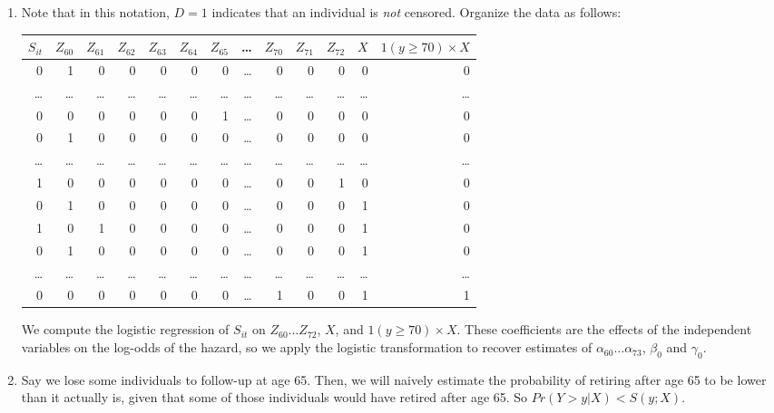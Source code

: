 \documentclass{article}
\begin{document}
\begin{enumerate}
\begin{enumerate}
		\item

		Note that in this notation, $D = 1$ indicates that an individual is \textit{not} censored. Organize the data as follows:

		\begin{tabular}{ r r r r r r r r r r r r r} 
		  $S_{it}$ & $Z_{60}$ & $Z_{61}$ & $Z_{62}$ & $Z_{63}$ & $Z_{64}$ & $Z_{65}$ &\ldots & $Z_{70}$ & $Z_{71}$ & $Z_{72}$ & $X$ & $1(y\geq 70) \times X$ \\ \hline
		  0 & 1 & 0 & 0 & 0 & 0 & 0 & \ldots & 0 & 0 & 0 & 0 & 0 \\
		  \ldots & \ldots & \ldots & \ldots & \ldots & \ldots & \ldots & \ldots & \ldots & \ldots & \ldots & \ldots & \ldots \\
		  0 & 0 & 0 & 0 & 0 & 0 & 1 & \ldots & 0 & 0 & 0 & 0 & 0 \\ \hline
		  0 & 1 & 0 & 0 & 0 & 0 & 0 & \ldots & 0 & 0 & 0 & 0 & 0 \\
		  \ldots & \ldots & \ldots & \ldots & \ldots & \ldots & \ldots & \ldots & \ldots & \ldots & \ldots & \ldots & \ldots \\
		  1 & 0 & 0 & 0 & 0 & 0 & 0 & \ldots & 0 & 0 & 1 & 0 & 0 \\ \hline
		  0 & 1 & 0 & 0 & 0 & 0 & 0 & \ldots & 0 & 0 & 0 & 1 & 0 \\
		  1 & 0 & 1 & 0 & 0 & 0 & 0 & \ldots & 0 & 0 & 0 & 1 & 0 \\ \hline
		  0 & 1 & 0 & 0 & 0 & 0 & 0 & \ldots & 0 & 0 & 0 & 1 & 0 \\
		  \ldots & \ldots & \ldots & \ldots & \ldots & \ldots & \ldots & \ldots & \ldots & \ldots & \ldots & \ldots & \ldots \\
		  0 & 0 & 0 & 0 & 0 & 0 & 0 & \ldots & 1 & 0 & 0 & 1 & 1 \\

		\end{tabular}

		We compute the logistic regression of $S_{it}$ on $Z_{60}\ldots Z_{72}$, $X$, and $1(y\geq 70) \times X$. These coefficients are the effects of the independent variables on the log-odds of the hazard, so we apply the logistic transformation to recover estimates of $\alpha_{60} \ldots \alpha_{73}$, $\beta_0$ and $\gamma_0$.

		\item

		Say we lose some individuals to follow-up at age 65. Then, we will naively estimate the probability of retiring after age 65 to be lower than it actually is, given that some of those individuals would have retired after age 65. So $Pr(Y > y|X) < S(y; X)$.


\end{enumerate}
\end{enumerate}
\end{document}
